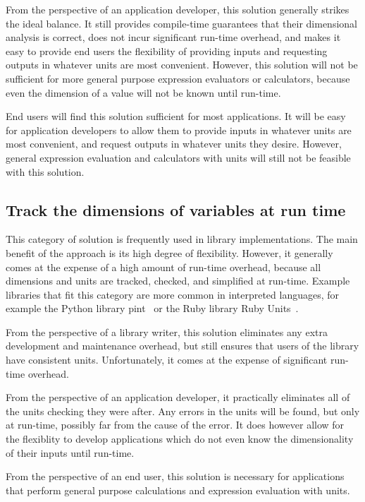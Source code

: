 \documentclass{article}
\begin{document}
From the perspective of an application developer, this solution generally strikes the ideal balance.
It still provides compile-time guarantees that their dimensional analysis is correct,
does not incur significant run-time overhead,
and makes it easy to provide end users the flexibility of providing inputs and requesting outputs in whatever units are most convenient.
However, this solution will not be sufficient for more general purpose expression evaluators or calculators,
because even the dimension of a value will not be known until run-time.

End users will find this solution sufficient for most applications.
It will be easy for application developers to allow them to provide inputs in whatever units are most convenient,
and request outputs in whatever units they desire.
However, general expression evaluation and calculators with units will still not be feasible with this solution.

\subsection{Track the dimensions of variables at run time}
\label{dynamic-dimensions}

This category of solution is frequently used in library implementations.
The main benefit of the approach is its high degree of flexibility.
However, it generally comes at the expense of a high amount of run-time overhead,
because all dimensions and units are tracked, checked, and simplified at run-time.
Example libraries that fit this category are more common in interpreted languages,
for example the Python library pint~\cite{Grecco2021} or the Ruby library Ruby Units~\cite{Olbrich2021}.

From the perspective of a library writer, this solution eliminates any extra development and maintenance overhead,
but still ensures that users of the library have consistent units.
Unfortunately, it comes at the expense of significant run-time overhead.

From the perspective of an application developer, it practically eliminates all of the units checking they were after.
Any errors in the units will be found, but only at run-time, possibly far from the cause of the error.
It does however allow for the flexiblity to develop applications which do not even know the dimensionality of their inputs until run-time.

From the perspective of an end user, this solution is necessary for applications that perform general purpose calculations and expression evaluation with units.
\end{document}
